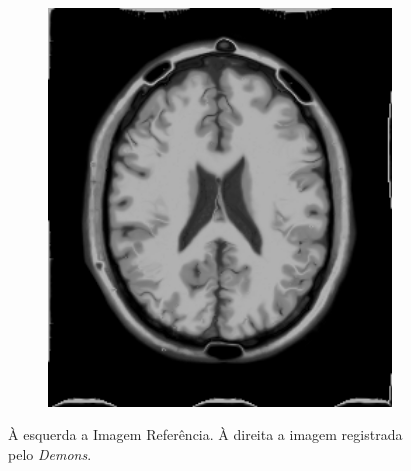 \documentclass[t]{beamer}
\begin{document}
\begin{frame}
\begin{figure}[H]
\begin{subfigure}[b]{0.49\textwidth}
      \includegraphics[width=1\textwidth]{figuras/resultSinDemon.png}
    \end{subfigure}
    \caption{À esquerda a Imagem Referência. À direita a imagem registrada pelo \textit{Demons}.}
  \end{figure}
\end{frame}
\end{document}
